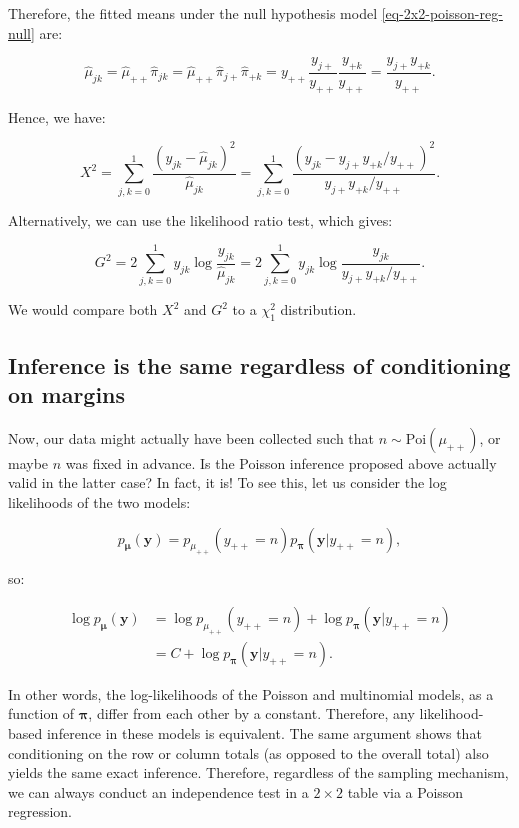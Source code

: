 \documentclass[
  11pt,
  letterpaper,
  oneside]{book}
\theoremstyle{plain}
\theoremstyle{plain}
\theoremstyle{definition}
\theoremstyle{definition}
\theoremstyle{plain}
\theoremstyle{remark}
\begin{document}
Therefore, the fitted means under the null hypothesis model
\ref{eq-2x2-poisson-reg-null} are:

\[
\hat \mu_{jk} = \hat \mu_{++}\hat \pi_{jk} = \hat \mu_{++}\hat \pi_{j+}\hat \pi_{+k} = y_{++}\frac{y_{j+}}{y_{++}}\frac{y_{+k}}{y_{++}} = \frac{y_{j+}y_{+k}}{y_{++}}.
\]

Hence, we have:

\[
X^2 = \sum_{j,k = 0}^1 \frac{(y_{jk} - \widehat \mu_{jk})^2}{\widehat \mu_{jk}} = \sum_{j, k = 0}^1 \frac{(y_{jk} - y_{j+}y_{+k}/y_{++})^2}{y_{j+}y_{+k}/y_{++}}.
\]

Alternatively, we can use the likelihood ratio test, which gives:

\[
G^2 = 2\sum_{j,k = 0}^1 y_{jk}\log\frac{y_{jk}}{\widehat \mu_{jk}} = 2\sum_{j, k = 0}^1 y_{jk}\log\frac{y_{jk}}{y_{j+}y_{+k}/y_{++}}.
\]

We would compare both \(X^2\) and \(G^2\) to a \(\chi^2_1\)
distribution.

\hypertarget{sec-inference-conditioning-margins}{%
\subsection{Inference is the same regardless of conditioning on
margins}\label{sec-inference-conditioning-margins}}

Now, our data might actually have been collected such that
\(n \sim \text{Poi}(\mu_{++})\), or maybe \(n\) was fixed in advance. Is
the Poisson inference proposed above actually valid in the latter case?
In fact, it is! To see this, let us consider the log likelihoods of the
two models:

\[
p_{\boldsymbol{\mu}}(\boldsymbol{y}) = p_{\mu_{++}}(y_{++} = n)p_{\boldsymbol{\pi}}(\boldsymbol{y} | y_{++} = n),
\]

so:

\[
\begin{split}
\log p_{\boldsymbol{\mu}}(\boldsymbol{y}) &= \log p_{\mu_{++}}(y_{++} = n) + \log p_{\boldsymbol{\pi}}(\boldsymbol{y} | y_{++} = n) \\
&= C + \log p_{\boldsymbol{\pi}}(\boldsymbol{y} | y_{++} = n).
\end{split}
\]

In other words, the log-likelihoods of the Poisson and multinomial
models, as a function of \(\boldsymbol{\pi}\), differ from each other by
a constant. Therefore, any likelihood-based inference in these models is
equivalent. The same argument shows that conditioning on the row or
column totals (as opposed to the overall total) also yields the same
exact inference. Therefore, regardless of the sampling mechanism, we can
always conduct an independence test in a \(2 \times 2\) table via a
Poisson regression.
\end{document}
